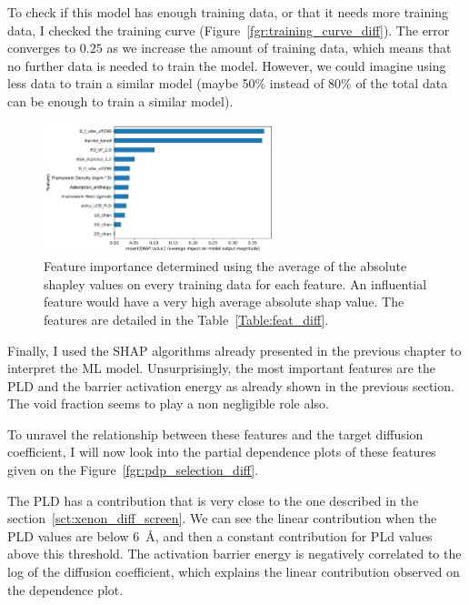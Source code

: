 \documentclass[main]{subfiles}
\begin{document}
To check if this model has enough training data, or that it needs more training data, I checked the training curve (Figure~\ref{fgr:training_curve_diff}). The error converges to $0.25$ as we increase the amount of training data, which means that no further data is needed to train the model. However, we could imagine using less data to train a similar model (maybe 50\% instead of 80\% of the total data can be enough to train a similar model). 

\begin{figure}[ht]
  \centering
  \includegraphics[width=0.6\textwidth]{figures/5-diffusion/Diff_Feature_importance_shapbased.pdf}
  \caption{ Feature importance determined using the average of the absolute shapley values on every training data for each feature. An influential feature would have a very high average absolute shap value. The features are detailed in the Table~\ref{Table:feat_diff}. }\label{fgr:feat_imp_diff}
\end{figure}

Finally, I used the SHAP algorithms already presented in the previous chapter to interpret the ML model. Unsurprisingly, the most important features are the PLD and the barrier activation energy as already shown in the previous section. The void fraction seems to play a non negligible role also.

To unravel the relationship between these features and the target diffusion coefficient, I will now look into the partial dependence plots of these features given on the Figure~\ref{fgr:pdp_selection_diff}. 

The PLD has a contribution that is very close to the one described in the section~\ref{sct:xenon_diff_screen}. We can see the linear contribution when the PLD values are below \SI{6}{\angstrom}, and then a constant contribution for PLd values above this threshold. The activation barrier energy is negatively correlated to the log of the diffusion coefficient, which explains the linear contribution observed on the dependence plot. 
\end{document}
